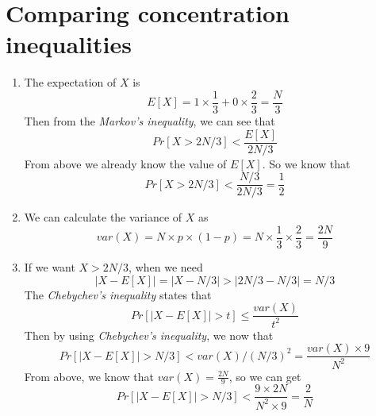 \documentclass{article}
\begin{document}
	\section{Comparing concentration inequalities}
		\begin{enumerate}
			\item The expectation of $X$ is \begin{equation}
				E\left[X\right] = 1 \times \frac{1}{3} + 0 \times \frac{2}{3} = \frac{N}{3}
				\end{equation}
				Then from the \emph{Markov's inequality}, we can see that \begin{equation}
					Pr\left[ X > 2N / 3 \right] < \frac{E \left[ X \right] }{2N / 3}
				\end{equation}
				From above we already know the value of $E\left[X\right]$. So we know that \begin{equation}
					Pr\left[X > 2N / 3\right] < \frac{N / 3}{2N / 3} = \frac{1}{2}
				\end{equation}
			\item We can calculate the variance of $X$ as \begin{equation}
					var(X) = N \times p \times (1 - p) = N \times \frac{1}{3} \times \frac{2}{3} = \frac{2N}{9}
				\end{equation}
			\item 
				If we want $X > 2N / 3$, when we need \begin{equation}
					|X - E\left[X\right]| = |X - N / 3| > |2N / 3 - N / 3| = N / 3
				\end{equation}
				The \emph{Chebychev's inequality} states that \begin{equation}
					Pr\left[|X - E[X]| > t\right] \leq \frac{var(X)}{t^2}
				\end{equation}
				Then by using \emph{Chebychev's inequality}, we now that \begin{equation}
					Pr\left[|X - E[X]| > N / 3 \right] < var(X) / (N / 3)^2 = \frac{var(X) \times 9} { N^2}
				\end{equation}
				From above, we know that $var(X) = \frac{2N}{9}$, so we can get \begin{equation}
					Pr\left[|X - E[X]| > N / 3 \right] < \frac{9 \times 2N}{ N^2 \times 9} = \frac{2}{N}
				\end{equation}

\end{enumerate}
\end{document}
